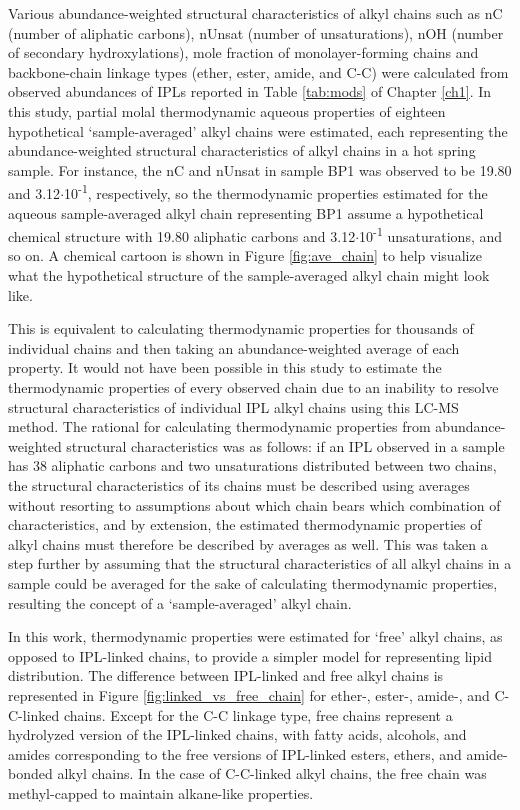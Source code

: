Various abundance-weighted structural characteristics of alkyl chains such as nC (number of aliphatic carbons), nUnsat (number of unsaturations), nOH (number of secondary hydroxylations), mole fraction of monolayer-forming chains and backbone-chain linkage types (ether, ester, amide, and C-C) were calculated from observed abundances of IPLs reported in Table \ref{tab:mods} of Chapter \ref{ch1}. In this study, partial molal thermodynamic aqueous properties of eighteen hypothetical `sample-averaged' alkyl chains were estimated, each representing the abundance-weighted structural characteristics of alkyl chains in a hot spring sample. For instance, the nC and nUnsat in sample BP1 was observed to be 19.80 and 3.12$\cdot$10\textsuperscript{-1}, respectively, so the thermodynamic properties estimated for the aqueous sample-averaged alkyl chain representing BP1 assume a hypothetical chemical structure with 19.80 aliphatic carbons and 3.12$\cdot$10\textsuperscript{-1} unsaturations, and so on.  A chemical cartoon is shown in Figure \ref{fig:ave_chain} to help visualize what the hypothetical structure of the sample-averaged alkyl chain might look like.

This is equivalent to calculating thermodynamic properties for thousands of individual chains and then taking an abundance-weighted average of each property. It would not have been possible in this study to estimate the thermodynamic properties of every observed chain due to an inability to resolve structural characteristics of individual IPL alkyl chains using this LC-MS method. The rational for calculating thermodynamic properties from abundance-weighted structural characteristics was as follows: if an IPL observed in a sample has 38 aliphatic carbons and two unsaturations distributed between two chains, the structural characteristics of its chains must be described using averages without resorting to assumptions about which chain bears which combination of characteristics, and by extension, the estimated thermodynamic properties of alkyl chains must therefore be described by averages as well. This was taken a step further by assuming that the structural characteristics of all alkyl chains in a sample could be averaged for the sake of calculating thermodynamic properties, resulting the concept of a `sample-averaged' alkyl chain.

In this work, thermodynamic properties were estimated for `free' alkyl chains, as opposed to IPL-linked chains, to provide a simpler model for representing lipid distribution. The difference between IPL-linked and free alkyl chains is represented in Figure \ref{fig:linked_vs_free_chain} for ether-, ester-, amide-, and C-C-linked chains. Except for the C-C linkage type, free chains represent a hydrolyzed version of the IPL-linked chains, with fatty acids, alcohols, and amides corresponding to the free versions of IPL-linked esters, ethers, and amide-bonded alkyl chains. In the case of C-C-linked alkyl chains, the free chain was methyl-capped to maintain alkane-like properties.



